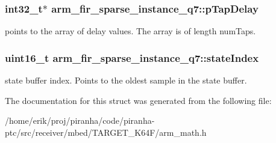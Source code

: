 \subsubsection[{\texorpdfstring{p\+Tap\+Delay}{pTapDelay}}]{\setlength{\rightskip}{0pt plus 5cm}int32\+\_\+t$\ast$ arm\+\_\+fir\+\_\+sparse\+\_\+instance\+\_\+q7\+::p\+Tap\+Delay}\hypertarget{structarm__fir__sparse__instance__q7_ac625393c84bc0342ffdf26fc4eba1ac1}{}\label{structarm__fir__sparse__instance__q7_ac625393c84bc0342ffdf26fc4eba1ac1}
points to the array of delay values. The array is of length num\+Taps. 
\subsubsection[{\texorpdfstring{state\+Index}{stateIndex}}]{\setlength{\rightskip}{0pt plus 5cm}uint16\+\_\+t arm\+\_\+fir\+\_\+sparse\+\_\+instance\+\_\+q7\+::state\+Index}\hypertarget{structarm__fir__sparse__instance__q7_a2d2e65473fe3a3f2b953b4e0b60824df}{}\label{structarm__fir__sparse__instance__q7_a2d2e65473fe3a3f2b953b4e0b60824df}
state buffer index. Points to the oldest sample in the state buffer. 

The documentation for this struct was generated from the following file\+:\begin{DoxyCompactItemize}
\item 
/home/erik/proj/piranha/code/piranha-\/ptc/src/receiver/mbed/\+T\+A\+R\+G\+E\+T\+\_\+\+K64\+F/arm\+\_\+math.\+h\end{DoxyCompactItemize}
